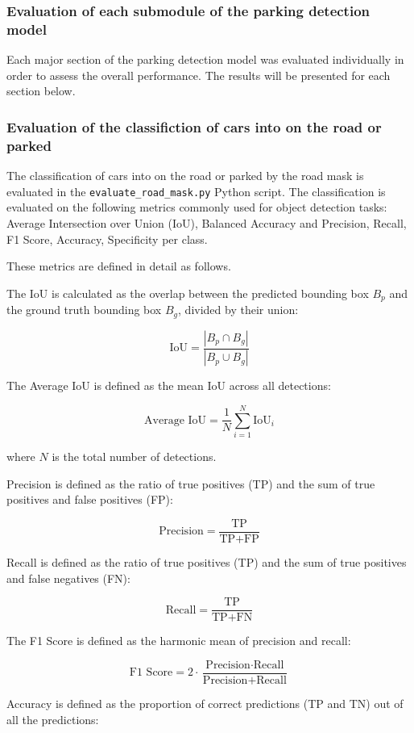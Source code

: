 \subsubsection{Evaluation of each submodule of the parking detection model}
Each major section of the parking detection model was evaluated individually in order to assess the overall performance. The results will be presented for each section below.

\subsubsection{Evaluation of the classifiction of cars into on the road or parked}
The classification of cars into on the road or parked by the road mask is evaluated in the \texttt{evaluate\_road\_mask.py} Python script.
The classification is evaluated on the following metrics commonly used for object detection tasks: Average Intersection over Union (IoU), Balanced Accuracy and Precision, Recall, F1 Score, Accuracy, Specificity per class.

These metrics are defined in detail as follows.

The IoU is calculated as the overlap between the predicted bounding box \( B_p \) and the ground truth bounding box \( B_g \), divided by their union:

\[
\text{IoU} = \frac{|B_p \cap B_g|}{|B_p \cup B_g|}
\]

The Average IoU is defined as the mean IoU across all detections:

\[
\text{Average IoU} = \frac{1}{N} \sum_{i=1}^{N} \text{IoU}_i
\]

where \( N \) is the total number of detections.

Precision is defined as the ratio of true positives (TP) and the sum of true positives and false positives (FP):

\[
\text{Precision} = \frac{\text{TP}}{\text{TP} + \text{FP}}
\]

Recall is defined as the ratio of true positives (TP) and the sum of true positives and false negatives (FN):

\[
\text{Recall} = \frac{\text{TP}}{\text{TP} + \text{FN}}
\]

The F1 Score is defined as the harmonic mean of precision and recall:

\[
\text{F1 Score} = 2 \cdot \frac{\text{Precision} \cdot \text{Recall}}{\text{Precision} + \text{Recall}}
\]

Accuracy is defined as the proportion of correct predictions (TP and TN) out of all the predictions:

